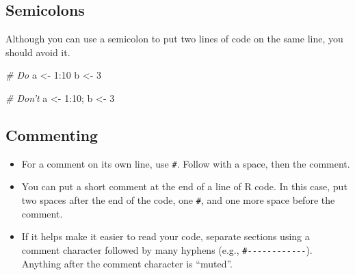 \documentclass[]{book}
\makeatletter
\newenvironment{Shaded}{\begin{snugshade}}{\end{snugshade}}
\newcommand{\KeywordTok}[1]{\textcolor[rgb]{0.13,0.29,0.53}{\textbf{{#1}}}}
\newcommand{\DecValTok}[1]{\textcolor[rgb]{0.00,0.00,0.81}{{#1}}}
\newcommand{\StringTok}[1]{\textcolor[rgb]{0.31,0.60,0.02}{{#1}}}
\newcommand{\CommentTok}[1]{\textcolor[rgb]{0.56,0.35,0.01}{\textit{{#1}}}}
\newcommand{\NormalTok}[1]{{#1}}
\providecommand{\tightlist}{%
  \setlength{\itemsep}{0pt}\setlength{\parskip}{0pt}}
\newenvironment{kframe}{%
\medskip{}
\setlength{\fboxsep}{.8em}
 \def\at@end@of@kframe{}%
 \ifinner\ifhmode%
  \def\at@end@of@kframe{\end{minipage}}%
  \begin{minipage}{\columnwidth}%
 \fi\fi%
 \def\FrameCommand##1{\hskip\@totalleftmargin \hskip-\fboxsep
 \colorbox{shadecolor}{##1}\hskip-\fboxsep
     \hskip-\linewidth \hskip-\@totalleftmargin \hskip\columnwidth}%
 \MakeFramed {\advance\hsize-\width
   \@totalleftmargin\z@ \linewidth\hsize
   \@setminipage}}%
 {\par\unskip\endMakeFramed%
 \at@end@of@kframe}
\renewenvironment{Shaded}{\begin{kframe}}{\end{kframe}}
\makeatother
\begin{document}
\begin{Shaded}
\end{Shaded}

\subsection{Semicolons}\label{semicolons}

Although you can use a semicolon to put two lines of code on the same
line, you should avoid it.

\begin{Shaded}
\begin{Highlighting}[]
\CommentTok{# Do}
\NormalTok{a <-}\StringTok{ }\DecValTok{1}\NormalTok{:}\DecValTok{10}
\NormalTok{b <-}\StringTok{ }\DecValTok{3}

\CommentTok{# Don't}
\NormalTok{a <-}\StringTok{ }\DecValTok{1}\NormalTok{:}\DecValTok{10}\NormalTok{; b <-}\StringTok{ }\DecValTok{3}
\end{Highlighting}
\end{Shaded}

\subsection{Commenting}\label{commenting}

\begin{itemize}
\tightlist
\item
  For a comment on its own line, use \texttt{\#}. Follow with a space,
  then the comment.
\item
  You can put a short comment at the end of a line of R code. In this
  case, put two spaces after the end of the code, one \texttt{\#}, and
  one more space before the comment.
\item
  If it helps make it easier to read your code, separate sections using
  a comment character followed by many hyphens (e.g.,
  \texttt{\#-\/-\/-\/-\/-\/-\/-\/-\/-\/-\/-\/-}). Anything after the
  comment character is ``muted''.
\end{itemize}
\end{document}
